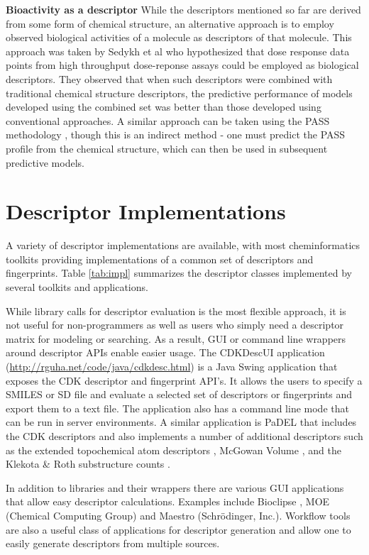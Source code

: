 \documentclass[letterpaper, 12pt]{article}
\begin{document}
\textbf{Bioactivity as a descriptor} While the descriptors mentioned
so far are derived from some form of chemical structure, an
alternative approach is to employ observed biological activities of a
molecule as descriptors of that molecule.  This approach was taken by
Sedykh et al \cite{Sedykh:2011fk} who hypothesized that dose response
data points from high throughput dose-reponse assays could be employed
as biological descriptors. They observed that when such descriptors
were combined with traditional chemical structure descriptors, the
predictive performance of models developed using the combined set was
better than those developed using conventional approaches. A similar
approach can be taken using the PASS methodology
\cite{Poroikov:2007aa}, though this is an indirect method - one must
predict the PASS profile from the chemical structure, which can then
be used in subsequent predictive models.

\section{Descriptor Implementations}
\label{sec:descr-impl}

A variety of descriptor implementations are available, with most
cheminformatics toolkits providing implementations of a common set of
descriptors and fingerprints. Table \ref{tab:impl} summarizes the
descriptor classes implemented by several toolkits and applications. 

While library calls for descriptor evaluation is the most flexible
approach, it is not useful for non-programmers as well as users who
simply need a descriptor matrix for modeling or searching. As a
result, GUI or command line wrappers around descriptor APIs enable
easier usage. The CDKDescUI application
(\url{http://rguha.net/code/java/cdkdesc.html}) is a Java Swing
application that exposes the CDK descriptor and fingerprint API's. It
allows the users to specify a SMILES or SD file and evaluate a
selected set of descriptors or fingerprints and export them to a text
file. The application also has a command line mode that can be run in
server environments. A similar application is PaDEL \cite{Yap:2011fk}
that includes the CDK descriptors and also implements a number of
additional descriptors such as the extended topochemical atom
descriptors \cite{Roy:2004uq}, McGowan Volume \cite{Zhao:2003kx}, and
the Klekota \& Roth substructure counts \cite{Klekota:2008vn}.

In addition to libraries and their wrappers there are various GUI
applications that allow easy descriptor calculations. Examples include
Bioclipse \cite{Spjuth:2007aa}, MOE (Chemical Computing Group) and
Maestro (Schr\"{o}dinger, Inc.). Workflow tools are also a useful
class of applications for descriptor generation and allow one to
easily generate descriptors from multiple sources.
\end{document}
